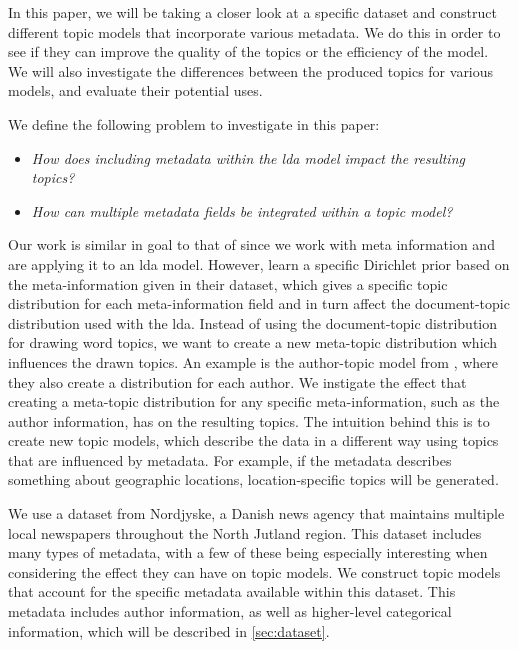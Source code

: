 In this paper, we will be taking a closer look at a specific dataset and construct different topic models that incorporate various metadata.
We do this in order to see if they can improve the quality of the topics or the efficiency of the model.
We will also investigate the differences between the produced topics for various models, and evaluate their potential uses.


We define the following problem to investigate in this paper:

\begin{itemize}
	\item \textit{How does including metadata within the \gls{lda} model impact the resulting topics?}
	\item \textit{How can multiple metadata fields be integrated within a topic model?}
\end{itemize}

Our work is similar in goal to that of \citet{MetaLDA2017} since we work with meta information and are applying it to an \gls{lda} model.
However, \citet{MetaLDA2017} learn a specific Dirichlet prior based on the meta-information given in their dataset, which gives a specific topic distribution for each meta-information field and in turn affect the document-topic distribution used with the \gls{lda}.
Instead of using the document-topic distribution for drawing word topics, we want to create a new meta-topic distribution which influences the drawn topics.
An example is the author-topic model from \citet{author_topic_2012}, where they also create a distribution for each author.
We instigate the effect that creating a meta-topic distribution for any specific meta-information, such as the author information, has on the resulting topics.
The intuition behind this is to create new topic models, which describe the data in a different way using topics that are influenced by metadata.
For example, if the metadata describes something about geographic locations, location-specific topics will be generated.

We use a dataset from Nordjyske, a Danish news agency that maintains multiple local newspapers throughout the North Jutland region.
This dataset includes many types of metadata, with a few of these being especially interesting when considering the effect they can have on topic models.
We construct topic models that account for the specific metadata available within this dataset.
This metadata includes author information, as well as higher-level categorical information, which will be described in \autoref{sec:dataset}.


